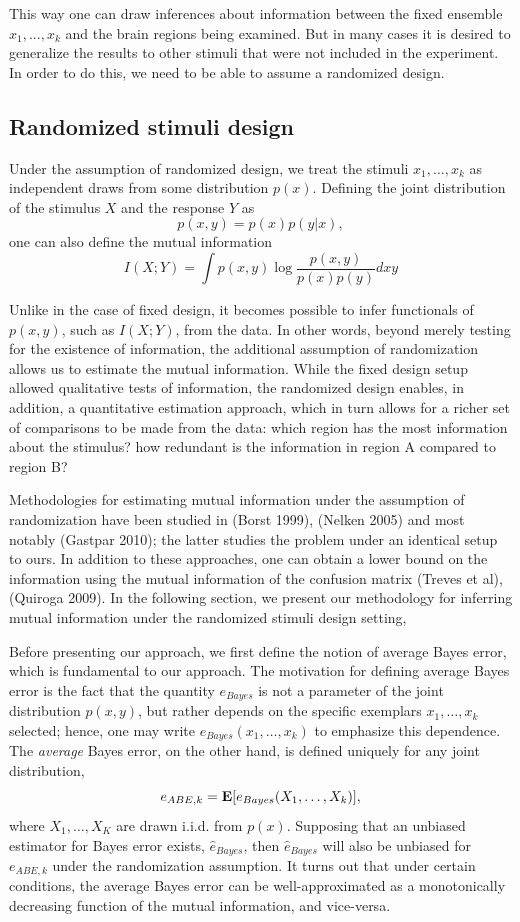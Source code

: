 \documentclass[12pt]{article}
\begin{document}
This way one can draw inferences about information between the fixed
ensemble $x_1,...,x_k$ and the brain regions being examined.  But in
many cases it is desired to generalize the results to other stimuli
that were not included in the experiment.  In order to do this, we
need to be able to assume a randomized design.

\subsection{Randomized stimuli design}

Under the assumption of randomized design, we treat the stimuli
$x_1,\hdots, x_k$ as independent draws from some distribution $p(x)$.
Defining the joint distribution of the stimulus $X$ and the response
$Y$ as
\[
p(x, y) = p(x) p(y|x),
\]
one can also define the mutual information
\[
I(X; Y) = \int p(x, y) \log \frac{p(x, y)}{p(x) p(y)} dxy
\]

Unlike in the case of fixed design, it becomes possible to infer functionals of $p(x, y)$, such as $I(X; Y)$,
from the data.
In other words, beyond merely testing for the existence of information,
the additional assumption of randomization allows us to estimate the mutual information.
While the fixed design setup allowed qualitative tests of information,
the randomized design enables, in addition, a quantitative estimation approach,
which in turn allows for a richer set of comparisons to be made from the data:
which region has the most information about the stimulus?  
how redundant is the information in region A compared to region B?

Methodologies for estimating mutual information under the assumption of randomization
have been studied in (Borst 1999), (Nelken 2005) and most notably (Gastpar 2010); the latter
studies the problem under an identical setup to ours.  In addition to these approaches,
one can obtain a lower bound on the information using the mutual information of the confusion matrix
(Treves et al), (Quiroga 2009).  In the following section, we present our methodology for
inferring mutual information under the randomized stimuli design setting,

Before presenting our approach, we first define the notion of average Bayes error, which is fundamental to our approach.
The motivation for defining average Bayes error is the fact that the quantity $e_{Bayes}$ is not
a parameter of the joint distribution $p(x, y)$, but rather depends on
the specific exemplars $x_1,\hdots, x_k$ selected; hence, one may
write $e_{Bayes}(x_1,\hdots, x_k)$ to emphasize this dependence. 
The \emph{average} Bayes error, on the other hand, is defined uniquely for any joint distribution,
\begin{equation}\label{eq:abe}
e_{ABE, k} = \textbf{E}[e_{Bayes}(X_1,\hdots, X_k)],
\end{equation}
where $X_1,\hdots, X_K$ are drawn i.i.d. from $p(x)$.
Supposing that an unbiased estimator for Bayes error exists, $\hat{e}_{Bayes}$,
then $\hat{e}_{Bayes}$ will also be unbiased for $e_{ABE, k}$ under the randomization assumption.
It turns out that under certain conditions, the average Bayes error can be well-approximated as a monotonically decreasing function of the mutual information, and vice-versa.
\end{document}

